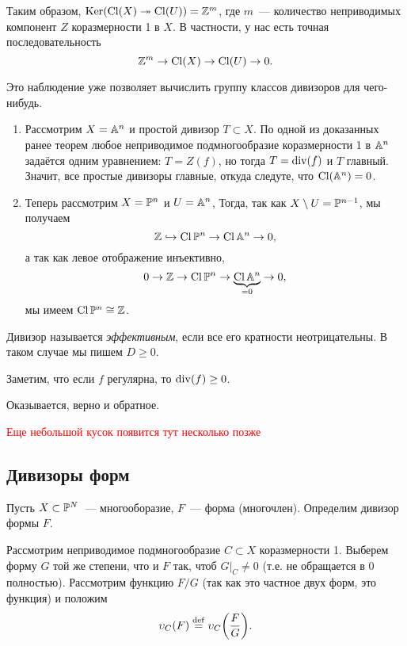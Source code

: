 	Таким образом, $\Ker\lr*{\Cl(X) \twoheadrightarrow \Cl(U)} = \Z^m$, где $m$~--- количество неприводимых компонент $Z$ коразмерности 1 в $X$. В частности, у нас есть точная последовательность 
	\[
		\Z^m \to \Cl(X) \to \Cl(U) \to 0. 
	\]

	\begin{example}
		Это наблюдение уже позволяет вычислить группу классов дивизоров для чего-нибудь. 

		\begin{enumerate}
			\item Рассмотрим $X = \AA^n$ и простой дивизор $T \subset X$. По одной из доказанных ранее теорем любое неприводимое подмногообразие коразмерности 1 в $\AA^n$ задаётся одним уравнением: $T = Z(f)$, но тогда $T = \Div(f)$ и $T$ главный. Значит, все простые дивизоры главные, откуда следуте, что $\Cl(\AA^n) = 0$.

			\item Теперь рассмотрим $X = \PP^n$ и $U = \AA^{n}$, Тогда, так как $X \setminus U = \PP^{n - 1}$, мы получаем 
			\[
				\Z \hookrightarrow \Cl{\PP^n} \to \Cl{\AA^n} \to 0,
			\]
			а так как левое отображение инъективно, 
			\[
				0 \to \Z \to \Cl{\PP^n} \to \underbrace{\Cl{\AA^n}}_{ = 0} \to 0,
			\]
			мы имеем $\Cl{\PP^n} \cong \Z$. 
		\end{enumerate}
	\end{example}

	\begin{definition} 
		Дивизор называется \emph{эффективным}, если все его кратности неотрицательны. В таком случае мы пишем $D \ge 0$.
	\end{definition}

	\begin{remark}
		Заметим, что если $f$ регулярна, то $\Div(f) \ge 0$. 
	\end{remark}

	Оказывается, верно и обратное.

    \textcolor{red}{Еще небольшой кусок появится тут несколько позже}

	\subsection{Дивизоры форм}

	Пусть $X \subset \PP^N$~--- многооборазие, $F$~--- форма (многочлен). Определим дивизор формы $F$.

	Рассмотрим неприводимое подмногообразие $C \subset X$ коразмерности 1. Выберем форму $G$ той же степени, что и $F$ так, чтоб $G\vert_{C} \neq 0$ (т.е. не обращается в 0 полностью). Рассмотрим функцию $F/G$ (так как это частное двух форм, это функция) и положим 
	\[
		\v_{C}(F) \eqdef \v_{C}\lr*{\frac{F}{G}}.
	\]

